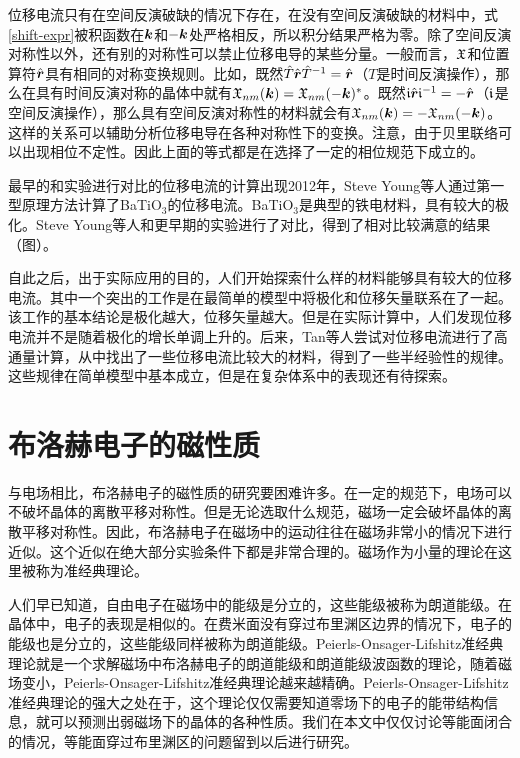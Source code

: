 位移电流只有在空间反演破缺的情况下存在，在没有空间反演破缺的材料中，式\ref{shift-expr}被积函数在$\boldsymbol{k}$和$-\boldsymbol{k}$处严格相反，所以积分结果严格为零。除了空间反演对称性以外，还有别的对称性可以禁止位移电导的某些分量。一般而言，$\mathfrak{X}$和位置算符$\hat{\boldsymbol{r}}$具有相同的对称变换规则。比如，既然$\hat{T}\hat{\boldsymbol{r}}\hat{T}^{-1}=\hat{\boldsymbol{r}}$（$T$是时间反演操作），那么在具有时间反演对称的晶体中就有$\mathfrak{X}_{nm}(\boldsymbol{k})=\mathfrak{X}_{nm}(-\boldsymbol{k})^*$。既然$\mathfrak{i} \hat{\boldsymbol{r}} \mathfrak{i}^{-1}=-\hat{\boldsymbol{r}}$（$\mathfrak{i}$是空间反演操作），那么具有空间反演对称性的材料就会有$\mathfrak{X}_{nm}(\boldsymbol{k})=-\mathfrak{X}_{nm}(-\boldsymbol{k})$。这样的关系可以辅助分析位移电导在各种对称性下的变换。注意，由于贝里联络可以出现相位不定性。因此上面的等式都是在选择了一定的相位规范下成立的。

最早的和实验进行对比的位移电流的计算出现2012年，Steve Young等人通过第一型原理方法计算了BaTiO$_3$的位移电流。BaTiO$_3$是典型的铁电材料，具有较大的极化。Steve Young等人和更早期的实验进行了对比，得到了相对比较满意的结果（图）。

自此之后，出于实际应用的目的，人们开始探索什么样的材料能够具有较大的位移电流。其中一个突出的工作是在最简单的模型中将极化和位移矢量联系在了一起。该工作的基本结论是极化越大，位移矢量越大。但是在实际计算中，人们发现位移电流并不是随着极化的增长单调上升的。后来，Tan等人尝试对位移电流进行了高通量计算，从中找出了一些位移电流比较大的材料，得到了一些半经验性的规律。这些规律在简单模型中基本成立，但是在复杂体系中的表现还有待探索。


\section{布洛赫电子的磁性质}

与电场相比，布洛赫电子的磁性质的研究要困难许多。在一定的规范下，电场可以不破坏晶体的离散平移对称性。但是无论选取什么规范，磁场一定会破坏晶体的离散平移对称性。因此，布洛赫电子在磁场中的运动往往在磁场非常小的情况下进行近似。这个近似在绝大部分实验条件下都是非常合理的。磁场作为小量的理论在这里被称为准经典理论。


人们早已知道，自由电子在磁场中的能级是分立的，这些能级被称为朗道能级。在晶体中，电子的表现是相似的。在费米面没有穿过布里渊区边界的情况下，电子的能级也是分立的，这些能级同样被称为朗道能级。Peierls-Onsager-Lifshitz准经典理论就是一个求解磁场中布洛赫电子的朗道能级和朗道能级波函数的理论，随着磁场变小，Peierls-Onsager-Lifshitz准经典理论越来越精确。Peierls-Onsager-Lifshitz准经典理论的强大之处在于，这个理论仅仅需要知道零场下的电子的能带结构信息，就可以预测出弱磁场下的晶体的各种性质。我们在本文中仅仅讨论等能面闭合的情况，等能面穿过布里渊区的问题留到以后进行研究。

